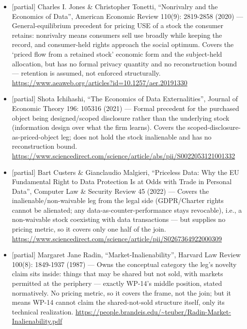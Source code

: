 \documentclass[
  11pt,
]{article}
\begin{document}
\begin{itemize}
\item
  {[}partial{]} Charles I. Jones \& Christopher Tonetti, ``Nonrivalry
  and the Economics of Data'', American Economic Review 110(9):
  2819-2858 (2020) --- General-equilibrium precedent for pricing USE of
  a stock the consumer retains: nonrivalry means consumers sell use
  broadly while keeping the record, and consumer-held rights approach
  the social optimum. Covers the `priced flow from a retained stock'
  economic form and the subject-held allocation, but has no formal
  privacy quantity and no reconstruction bound --- retention is assumed,
  not enforced structurally.
  \url{https://www.aeaweb.org/articles?id=10.1257/aer.20191330}
\item
  {[}partial{]} Shota Ichihashi, ``The Economics of Data
  Externalities'', Journal of Economic Theory 196: 105316 (2021) ---
  Formal precedent for the purchased object being designed/scoped
  disclosure rather than the underlying stock (information design over
  what the firm learns). Covers the scoped-disclosure-as-priced-object
  leg; does not hold the stock inalienable and has no reconstruction
  bound.
  \url{https://www.sciencedirect.com/science/article/abs/pii/S0022053121001332}
\item
  {[}partial{]} Bart Custers \& Gianclaudio Malgieri, ``Priceless Data:
  Why the EU Fundamental Right to Data Protection Is at Odds with Trade
  in Personal Data'', Computer Law \& Security Review 45 (2022) ---
  Covers the inalienable/non-waivable leg from the legal side
  (GDPR/Charter rights cannot be alienated; any
  data-as-counter-performance stays revocable), i.e., a non-waivable
  stock coexisting with data transactions --- but supplies no pricing
  metric, so it covers only one half of the join.
  \url{https://www.sciencedirect.com/science/article/pii/S0267364922000309}
\item
  {[}partial{]} Margaret Jane Radin, ``Market-Inalienability'', Harvard
  Law Review 100(8): 1849-1937 (1987) --- Owns the conceptual category
  the leg's novelty claim sits inside: things that may be shared but not
  sold, with markets permitted at the periphery --- exactly WP-14's
  middle position, stated normatively. No pricing metric, so it covers
  the frame, not the join; but it means WP-14 cannot claim the
  shared-not-sold structure itself, only its technical realization.
  \url{https://people.brandeis.edu/~teuber/Radin-Market-Inalienability.pdf}
\end{itemize}
\end{document}
